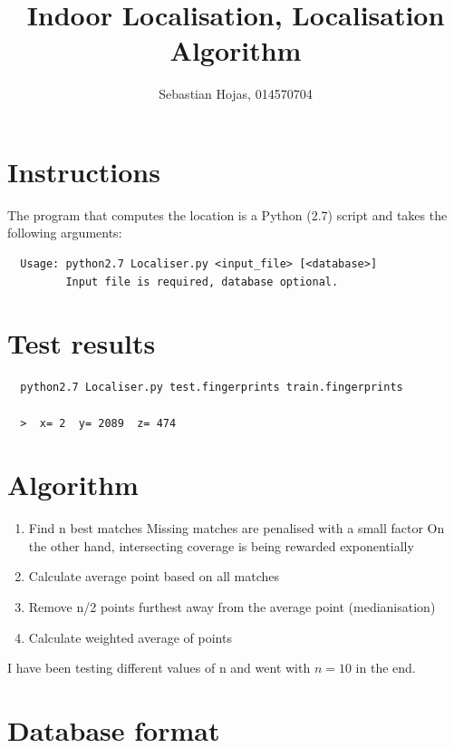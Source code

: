 \documentclass{article}
\begin{document}
\title{Indoor Localisation, Localisation Algorithm}
\author{Sebastian Hojas, 014570704}

\maketitle

\section{Instructions}

The program that computes the location is a Python (2.7) script and takes the following arguments:

\begin{verbatim}
  Usage: python2.7 Localiser.py <input_file> [<database>]
         Input file is required, database optional.
\end{verbatim}

\section{Test results}

\begin{verbatim}
  python2.7 Localiser.py test.fingerprints train.fingerprints

  >  x= 2  y= 2089  z= 474
\end{verbatim}

\section{Algorithm}

\begin{enumerate}
  \item Find n best matches
    \subitem Missing matches are penalised with a small factor
    \subitem On the other hand, intersecting coverage is being rewarded exponentially
  \item Calculate average point based on all matches
  \item Remove n/2 points furthest away from the average point (medianisation)
  \item Calculate weighted average of points
\end{enumerate}

I have been testing different values of n and went with $n=10$ in the end.

\section{Database format}
\end{document}
